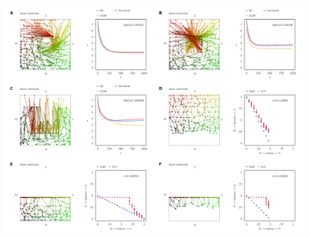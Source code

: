 \documentclass[11pt, a4paper]{article}
\begin{document}
\begin{figure}
{\centering
\includegraphics[width=0.75\linewidth]{./images/fig_GJ_surgical.png}
\par }

\end{figure}
\end{document}

